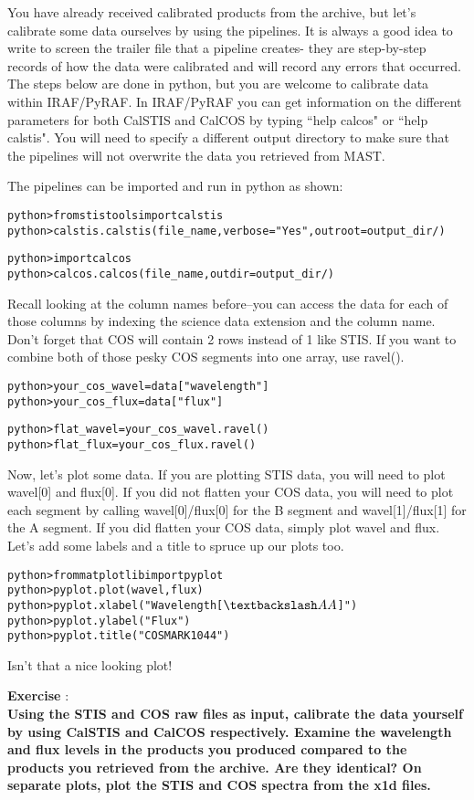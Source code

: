 You have already received calibrated products from the archive, but let's calibrate some data ourselves by using the pipelines.  It is always a good idea to write to screen the trailer file that a pipeline creates- they are step-by-step records of how the data were calibrated and will record any errors that occurred. The steps below are done in python, but you are welcome to calibrate data within IRAF/PyRAF. In IRAF/PyRAF you can get information on the different parameters for both CalSTIS and CalCOS by typing ``help calcos" or ``help calstis". You will need to specify a different output directory to make sure that the pipelines will not overwrite the data you retrieved from MAST.

The pipelines can be imported and run in python as shown:
\begin{alltt}
python> from stistools import calstis
python> calstis.calstis(file_name, verbose = "Yes", outroot=output_dir/)

python> import calcos
python> calcos.calcos(file_name, outdir=output_dir/)
\end{alltt}

Recall looking at the column names before--you can access the data for each of those columns by indexing the science data extension and the column name. Don't forget that COS will contain 2 rows instead of 1 like STIS. If you want to combine both of those pesky COS segments into one array, use ravel(). 
\begin{alltt}
python> your_cos_wavel = data["wavelength"]
python> your_cos_flux = data["flux"]

python> flat_wavel = your_cos_wavel.ravel()
python> flat_flux = your_cos_flux.ravel()
\end{alltt}
Now, let's plot some data. If you are plotting STIS data, you will need to plot wavel[0] and flux[0]. If you did not flatten your COS data, you will need to plot each segment by calling wavel[0]/flux[0] for the B segment and wavel[1]/flux[1] for the A segment. If you did flatten your COS data, simply plot wavel and flux. Let's add some labels and a title to spruce up our plots too.
\begin{alltt}
python> from matplotlib import pyplot
python> pyplot.plot(wavel, flux)
python> pyplot.xlabel("Wavelength [$\textbackslash AA$]")
python> pyplot.ylabel("Flux")
python> pyplot.title("COS MARK1044")
\end{alltt}
Isn't that a nice looking plot!

{\bf \color{blue} Exercise  }:  \\
{\bf Using the STIS and COS raw files as input, calibrate the data yourself by using CalSTIS and CalCOS respectively. Examine the wavelength and flux levels in the products you produced compared to the products you retrieved from the archive. Are they identical? On separate plots, plot the STIS and COS spectra from the x1d files.}

